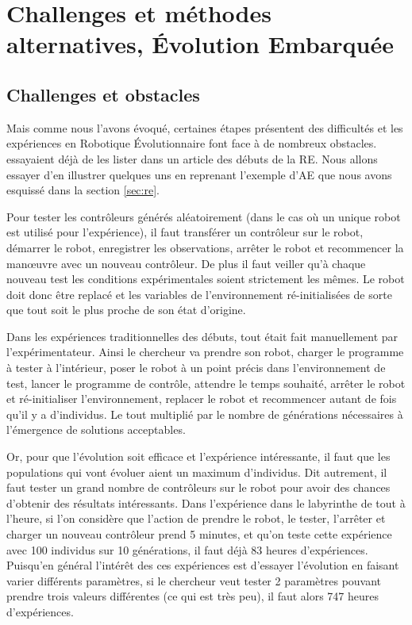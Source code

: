 \section{Challenges et méthodes alternatives, \'Evolution Embarquée}\label{sec:RE:EE}

\subsection{Challenges et obstacles}\label{sec:RE:EE:obs}

Mais comme nous l'avons évoqué, certaines étapes présentent des difficultés et les expériences en Robotique \'Evolutionnaire font face à de nombreux obstacles. \cite{mataric96challengesinevolvingcontrollersforphysicalrobots} essayaient déjà de les lister dans un article des débuts de la RE. Nous allons essayer d'en illustrer quelques uns en reprenant l'exemple d'AE que nous avons esquissé dans la section \ref{sec:re}.
 
 Pour tester les contrôleurs générés aléatoirement (dans le cas où un unique robot est utilisé pour l'expérience), il faut  transférer un contrôleur sur le robot, démarrer le robot, enregistrer les observations, arrêter le robot et recommencer la manœuvre avec un nouveau contrôleur. De plus il faut veiller qu'à chaque nouveau test les conditions expérimentales soient strictement les mêmes. Le robot doit donc être replacé et les variables de l'environnement ré-initialisées de sorte  que tout soit le plus proche de son état d'origine.

Dans les expériences traditionnelles des débuts, tout était fait manuellement par l'expérimentateur. Ainsi le chercheur va prendre son robot, charger le programme à tester à l'intérieur, poser le robot à un point précis dans l'environnement de test, lancer le programme de contrôle, attendre le temps souhaité, arrêter le robot et ré-initialiser l'environnement, replacer le robot et recommencer autant de fois qu'il y a d'individus. Le tout multiplié par le nombre de générations nécessaires à l'émergence de solutions acceptables.

Or, pour que l'évolution soit efficace et l'expérience intéressante, il faut que les populations qui vont évoluer aient un maximum d'individus. Dit autrement, il faut tester un grand nombre de contrôleurs sur le robot pour avoir des chances d'obtenir des résultats intéressants. Dans l'expérience dans le labyrinthe de tout à l'heure, si l'on considère que l'action de prendre le robot, le tester, l'arrêter et charger un nouveau contrôleur prend 5 minutes, et qu'on teste cette expérience avec 100 individus sur 10 générations, il faut déjà 83 heures d'expériences. Puisqu'en général l'intérêt des ces expériences est d'essayer l'évolution en faisant varier différents paramètres, si le chercheur veut tester 2 paramètres pouvant prendre trois valeurs différentes (ce qui est très peu), il faut alors 747 heures d'expériences.
 
